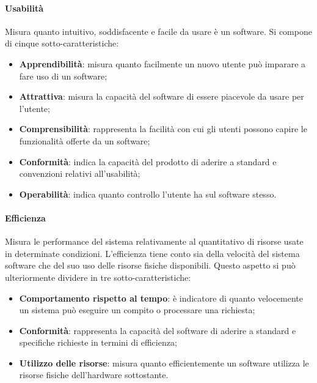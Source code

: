 \documentclass[10pt]{article}
\begin{document}
\begin{justify}
            \paragraph{Usabilità}
            Misura quanto intuitivo, soddisfacente e facile da usare è un software. Si compone di cinque sotto-caratteristiche:
            \begin{itemize}
                \item \textbf{Apprendibilità}: misura quanto facilmente un nuovo utente può imparare a fare uso di un software;
                \item \textbf{Attrattiva}: misura la capacità del software di essere piacevole da usare per l'utente;
                \item \textbf{Comprensibilità}: rappresenta la facilità con cui gli utenti possono capire le funzionalità offerte da un software;
                \item \textbf{Conformità}: indica la capacità del prodotto di aderire a standard e convenzioni relativi all'usabilità;
                \item \textbf{Operabilità}: indica quanto controllo l'utente ha sul software stesso.
            \end{itemize}

            \paragraph{Efficienza}
            Misura le performance del sistema relativamente al quantitativo di risorse usate in determinate condizioni. L'efficienza tiene conto sia della velocità
            del sistema software che del suo uso delle risorse fisiche disponibili. Questo aspetto si può ulteriormente dividere in tre sotto-caratteristiche:
            \begin{itemize}
                \item \textbf{Comportamento rispetto al tempo}: è indicatore di quanto velocemente un sistema può eseguire un compito o processare una richiesta;
                \item \textbf{Conformità}: rappresenta la capacità del software di aderire a standard e specifiche richieste in termini di efficienza;
                \item \textbf{Utilizzo delle risorse}: misura quanto efficientemente un software utilizza le risorse fisiche dell'hardware sottostante.
            \end{itemize}


\end{justify}
\end{document}
